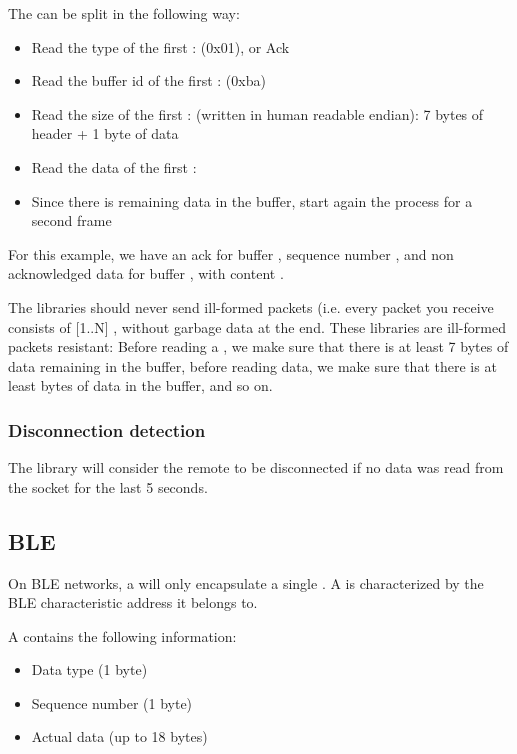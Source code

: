 The   can be split in the following way:\
\begin{itemize}
\item{Read the type of the first : \ARCode(0x01), or Ack}
\item{Read the buffer id of the first : \ARCode(0xba)}
\item{Read the size of the first : \ARCode{0x00000008} (written in human readable endian): 7 bytes of header + 1 byte of data}
\item{Read the data of the first \ARCode{frame}: \ARCode{0x42}}
\item{Since there is remaining data in the buffer, start again the process for a second frame}
\end{itemize}

For this example, we have an ack for buffer , sequence number , and non acknowledged data for buffer , with content .


The  libraries should never send ill-formed packets (i.e. every packet you receive consists of [1..N] , without garbage data at the end. These libraries are ill-formed packets resistant: Before reading a , we make sure that there is at least 7 bytes of data remaining in the buffer, before reading data, we make sure that there is at least  bytes of data in the buffer, and so on.

\subsubsection{Disconnection detection}

The  library will consider the remote to be disconnected if no data was read from the socket for the last 5 seconds.

\subsection{BLE}

On BLE networks, a  will only encapsulate a single . A  is characterized by the BLE characteristic address it belongs to.


A  contains the following information:
\begin{itemize}
\item{Data type (1 byte)}
\item{Sequence number (1 byte)}
\item{Actual data (up to 18 bytes)}
\end{itemize}

